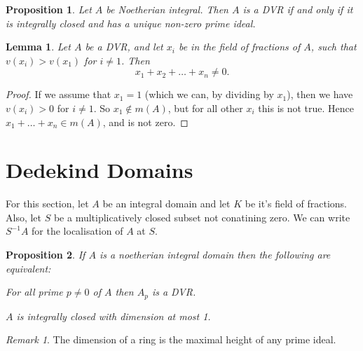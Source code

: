 \documentclass[11pt]{article} %
\newtheorem{lem}{Lemma}
\newtheorem{prop}{Proposition}
\theoremstyle{remark}\newtheorem*{rem}{Remark}
\begin{document}
\begin{prop}
 Let $A$ be Noetherian integral.
Then $A$ is a DVR if and only if it is integrally closed and has a unique non-zero prime ideal.
\end{prop}

\begin{lem}
 Let $A$ be a DVR, and let $x_i$ be in the field of fractions of $A$, such that $v(x_i)>v(x_1)$ for $i\neq 1$.
Then
\[
 x_1+x_2+\ldots +x_n \neq 0.
\]
\end{lem}
\begin{proof}
 If we assume that $x_1=1$ (which we can, by dividing by $x_1$), then we have $v(x_i)>0$ for $i\neq 1$.
So $x_1\notin m(A)$, but for all other $x_i$ this is not true.
Hence $x_1+\ldots+x_n \in m(A)$, and is not zero.
\end{proof}

\section{Dedekind Domains}
For this section, let $A$ be an integral domain and let $K$ be it's field of fractions.
Also, let $S$ be a multiplicatively closed subset not conatining zero. 
We can write $S^{-1}A$ for the localisation of $A$ at $S$.

\begin{prop}\label{remark}
 If $A$ is a noetherian integral domain then the following are equivalent:
 \begin{list}{}{}
  \item For all prime $p\neq 0$ of $A$ then $A_p$ is a DVR.\\
  \item $A$ is integrally closed with dimension at most 1.
 \end{list}
\end{prop}
\begin{rem}
 The dimension of a ring is the maximal height of any prime ideal.
\end{rem}
\end{document}
